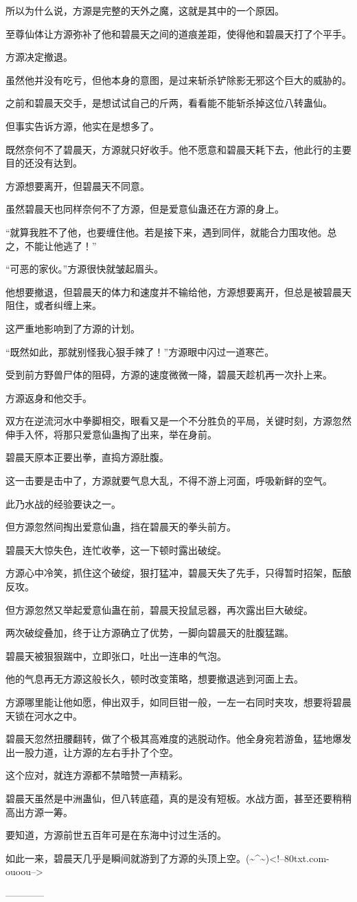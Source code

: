 \begin{this_body}
所以为什么说，方源是完整的天外之魔，这就是其中的一个原因。

至尊仙体让方源弥补了他和碧晨天之间的道痕差距，使得他和碧晨天打了个平手。

方源决定撤退。

虽然他并没有吃亏，但他本身的意图，是过来斩杀铲除影无邪这个巨大的威胁的。

之前和碧晨天交手，是想试试自己的斤两，看看能不能斩杀掉这位八转蛊仙。

但事实告诉方源，他实在是想多了。

既然奈何不了碧晨天，方源就只好收手。他不愿意和碧晨天耗下去，他此行的主要目的还没有达到。

方源想要离开，但碧晨天不同意。

虽然碧晨天也同样奈何不了方源，但是爱意仙蛊还在方源的身上。

“就算我胜不了他，也要缠住他。若是接下来，遇到同伴，就能合力围攻他。总之，不能让他逃了！”

“可恶的家伙。”方源很快就皱起眉头。

他想要撤退，但碧晨天的体力和速度并不输给他，方源想要离开，但总是被碧晨天阻住，或者纠缠上来。

这严重地影响到了方源的计划。

“既然如此，那就别怪我心狠手辣了！”方源眼中闪过一道寒芒。

受到前方野兽尸体的阻碍，方源的速度微微一降，碧晨天趁机再一次扑上来。

方源返身和他交手。

双方在逆流河水中拳脚相交，眼看又是一个不分胜负的平局，关键时刻，方源忽然伸手入怀，将那只爱意仙蛊掏了出来，举在身前。

碧晨天原本正要出拳，直捣方源肚腹。

这一击要是击中了，方源就要气息大乱，不得不游上河面，呼吸新鲜的空气。

此乃水战的经验要诀之一。

但方源忽然间掏出爱意仙蛊，挡在碧晨天的拳头前方。

碧晨天大惊失色，连忙收拳，这一下顿时露出破绽。

方源心中冷笑，抓住这个破绽，狠打猛冲，碧晨天失了先手，只得暂时招架，酝酿反攻。

但方源忽然又举起爱意仙蛊在前，碧晨天投鼠忌器，再次露出巨大破绽。

两次破绽叠加，终于让方源确立了优势，一脚向碧晨天的肚腹猛踹。

碧晨天被狠狠踹中，立即张口，吐出一连串的气泡。

他的气息再无方源这般长久，顿时改变策略，想要撤退逃到河面上去。

方源哪里能让他如愿，伸出双手，如同巨钳一般，一左一右同时夹攻，想要将碧晨天锁在河水之中。

碧晨天忽然扭腰翻转，做了个极其高难度的逃脱动作。他全身宛若游鱼，猛地爆发出一股力道，让方源的左右手扑了个空。

这个应对，就连方源都不禁暗赞一声精彩。

碧晨天虽然是中洲蛊仙，但八转底蕴，真的是没有短板。水战方面，甚至还要稍稍高出方源一筹。

要知道，方源前世五百年可是在东海中讨过生活的。

如此一来，碧晨天几乎是瞬间就游到了方源的头顶上空。(\~{}\^{}\~{})<!--80txt.com-ouoou-->

------------

\end{this_body}

